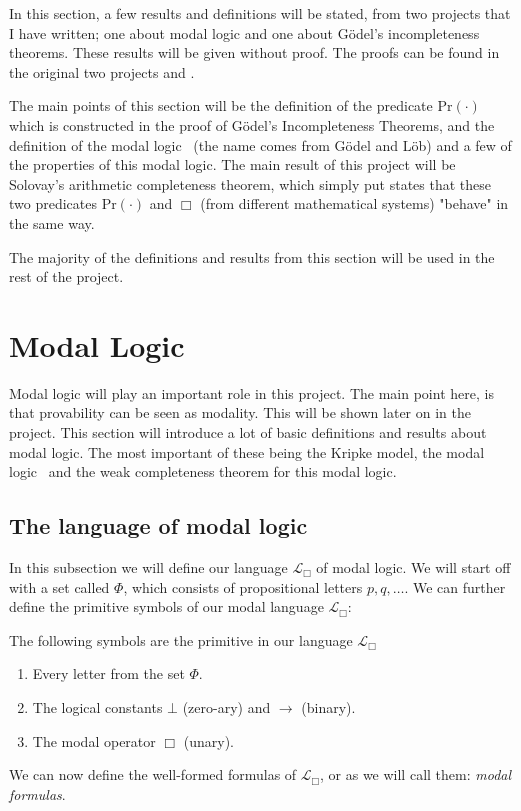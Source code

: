 \documentclass[../main.tex]{subfiles}
\begin{document}
In this section, a few results and definitions will be stated, from two projects that I have written; one about modal logic and one about Gödel's incompleteness
theorems.
These results will be given without proof. The proofs can be found in the
original 
two projects  \citet{Thor2021} and \citet{Thor2022}.

The main points of this section will be the definition of the predicate
$\text{Pr}(\cdot)$ which is constructed in the proof of  Gödel's Incompleteness
Theorems, and the definition of the modal logic \GL\
(the name comes from Gödel and Löb) and a few of the properties of this modal
logic. The
main result of this project will be Solovay's arithmetic completeness theorem,
which simply put states that these two predicates $\text{Pr}(\cdot)$ and $\Box$ (from different mathematical
systems) "behave" in the
same way.

The majority of the definitions and results from this section will be used in the rest of
the project.

\section{Modal Logic}
Modal logic will play an important role in this project. The main point here,
is that provability can be seen as modality. This will be shown later on in
the project. This section will introduce a lot of basic definitions and results
about modal logic. The most important of these being the Kripke model, the
modal logic \GL\ and the weak completeness theorem for this modal logic.

\subsection{The language of modal logic}
In this subsection we will define our language $\mathcal{L}_\Box$ of modal logic. 
We will start off  with a  set called $\Phi$, which consists of propositional
letters
$p,q,\ldots$. We can further define the primitive symbols of our modal language
$\mathcal{L}_\Box$:

\begin{defi}
	The following symbols are the primitive in our language
	$\mathcal{L}_\Box$
	\begin{enumerate}
		\item Every letter from the set $\Phi$.
		\item The logical constants $\bot$ (zero-ary) and $\rightarrow$
			(binary).
		\item The modal operator $\Box$ (unary).
	\end{enumerate}
\end{defi}
We can now define the well-formed formulas of $\mathcal{L}_\Box$, or as we will
call them: \textit{modal formulas}.
\end{document}
